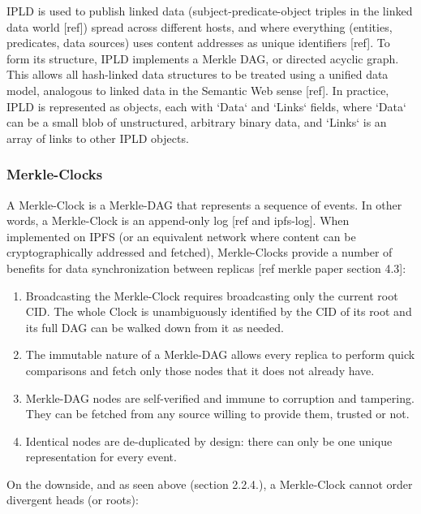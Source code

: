 \documentclass{comjnl}
\begin{document}
IPLD is used to publish linked data (subject-predicate-object triples in the linked data world [ref]) spread across different hosts, and where everything (entities, predicates, data sources) uses content addresses as unique identifiers [ref]. To form its structure, IPLD implements a Merkle DAG, or directed acyclic graph. This allows all hash-linked data structures to be treated using a unified data model, analogous to linked data in the Semantic Web sense [ref]. In practice, IPLD is represented as objects, each with `Data` and `Links` fields, where `Data` can be a small blob of unstructured, arbitrary binary data, and `Links` is an array of links to other IPLD objects. 

\subsubsection{Merkle-Clocks} \label{sec:merkleclocks}

A Merkle-Clock is a Merkle-DAG that represents a sequence of events. In other words, a Merkle-Clock is an append-only log [ref and ipfs-log]. When implemented on IPFS (or an equivalent network where content can be cryptographically addressed and fetched), Merkle-Clocks provide a number of benefits for data synchronization between replicas [ref merkle paper section 4.3]:

\begin{enumerate}
\item \label{Perf1}Broadcasting the Merkle-Clock requires broadcasting only the current root CID. The whole Clock is unambiguously identified by the CID of its root and its full DAG can be walked down from it as needed.
\item \label{Perf2}The immutable nature of a Merkle-DAG allows every replica to perform quick comparisons and fetch only those nodes that it does not already have.
\item \label{Perf3} Merkle-DAG nodes are self-verified and immune to corruption and tampering. They can be fetched from any source willing to provide them, trusted or not.
\item \label{Perf4} Identical nodes are de-duplicated by design: there can only be one unique representation for every event.
\end{enumerate}

On the downside, and as seen above (section 2.2.4.), a Merkle-Clock cannot order divergent heads (or roots):
\end{document}
